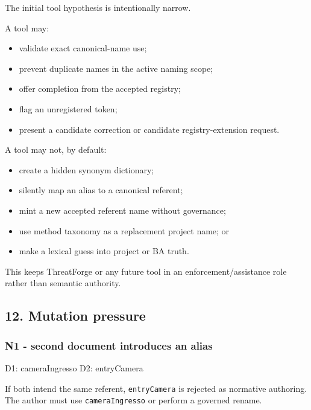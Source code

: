 \documentclass[
  10pt,
  a4paper,
]{article}
\newenvironment{Shaded}{}{}
\newcommand{\NormalTok}[1]{#1}
\providecommand{\tightlist}{%
  \setlength{\itemsep}{0pt}\setlength{\parskip}{0pt}}
\begin{document}
The initial tool hypothesis is intentionally narrow.

A tool may:

\begin{itemize}
\tightlist
\item
  validate exact canonical-name use;
\item
  prevent duplicate names in the active naming scope;
\item
  offer completion from the accepted registry;
\item
  flag an unregistered token;
\item
  present a candidate correction or candidate registry-extension
  request.
\end{itemize}

A tool may not, by default:

\begin{itemize}
\tightlist
\item
  create a hidden synonym dictionary;
\item
  silently map an alias to a canonical referent;
\item
  mint a new accepted referent name without governance;
\item
  use method taxonomy as a replacement project name; or
\item
  make a lexical guess into project or BA truth.
\end{itemize}

This keeps ThreatForge or any future tool in an enforcement/assistance
role rather than semantic authority.

\subsection{12. Mutation pressure}\label{mutation-pressure}

\subsubsection{N1 - second document introduces an
alias}\label{n1---second-document-introduces-an-alias}

\begin{Shaded}
\begin{Highlighting}[]
\NormalTok{D1: cameraIngresso}
\NormalTok{D2: entryCamera}
\end{Highlighting}
\end{Shaded}

If both intend the same referent, \texttt{entryCamera} is rejected as
normative authoring. The author must use \texttt{cameraIngresso} or
perform a governed rename.
\end{document}
